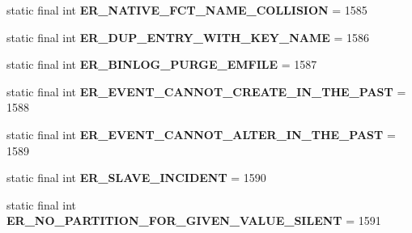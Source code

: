 \begin{DoxyCompactItemize}
static final int {\bfseries E\+R\+\_\+\+N\+A\+T\+I\+V\+E\+\_\+\+F\+C\+T\+\_\+\+N\+A\+M\+E\+\_\+\+C\+O\+L\+L\+I\+S\+I\+ON} = 1585
\item 
\mbox{\label{classcom_1_1mysql_1_1cj_1_1exceptions_1_1_mysql_error_numbers_adffb3c70241b6eef6a3e9355f6bb52c4}} 
static final int {\bfseries E\+R\+\_\+\+D\+U\+P\+\_\+\+E\+N\+T\+R\+Y\+\_\+\+W\+I\+T\+H\+\_\+\+K\+E\+Y\+\_\+\+N\+A\+ME} = 1586
\item 
\mbox{\label{classcom_1_1mysql_1_1cj_1_1exceptions_1_1_mysql_error_numbers_a589de63c531c9a3ab030621722c010ff}} 
static final int {\bfseries E\+R\+\_\+\+B\+I\+N\+L\+O\+G\+\_\+\+P\+U\+R\+G\+E\+\_\+\+E\+M\+F\+I\+LE} = 1587
\item 
\mbox{\label{classcom_1_1mysql_1_1cj_1_1exceptions_1_1_mysql_error_numbers_a26d6551290f8ea874eec436734bd5f1a}} 
static final int {\bfseries E\+R\+\_\+\+E\+V\+E\+N\+T\+\_\+\+C\+A\+N\+N\+O\+T\+\_\+\+C\+R\+E\+A\+T\+E\+\_\+\+I\+N\+\_\+\+T\+H\+E\+\_\+\+P\+A\+ST} = 1588
\item 
\mbox{\label{classcom_1_1mysql_1_1cj_1_1exceptions_1_1_mysql_error_numbers_aa6295bb2da396739582ab74974adcc1f}} 
static final int {\bfseries E\+R\+\_\+\+E\+V\+E\+N\+T\+\_\+\+C\+A\+N\+N\+O\+T\+\_\+\+A\+L\+T\+E\+R\+\_\+\+I\+N\+\_\+\+T\+H\+E\+\_\+\+P\+A\+ST} = 1589
\item 
\mbox{\label{classcom_1_1mysql_1_1cj_1_1exceptions_1_1_mysql_error_numbers_a56864d1ce035d9d3c05c78edf78813fe}} 
static final int {\bfseries E\+R\+\_\+\+S\+L\+A\+V\+E\+\_\+\+I\+N\+C\+I\+D\+E\+NT} = 1590
\item 
\mbox{\label{classcom_1_1mysql_1_1cj_1_1exceptions_1_1_mysql_error_numbers_af6262f9c86409b27a770e4c000dcb3e2}} 
static final int {\bfseries E\+R\+\_\+\+N\+O\+\_\+\+P\+A\+R\+T\+I\+T\+I\+O\+N\+\_\+\+F\+O\+R\+\_\+\+G\+I\+V\+E\+N\+\_\+\+V\+A\+L\+U\+E\+\_\+\+S\+I\+L\+E\+NT} = 1591
\item 
\mbox{\label{classcom_1_1mysql_1_1cj_1_1exceptions_1_1_mysql_error_numbers_a94cb0a794bd6cf4c7644207ba3636e04}} 

\end{DoxyCompactItemize}
